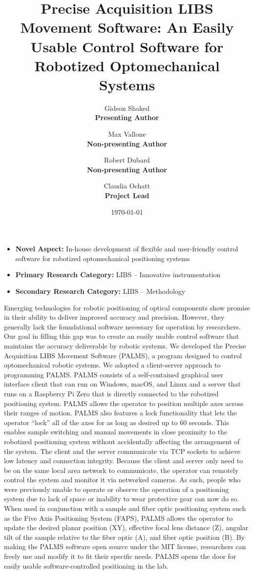 \documentclass[12pt]{article}
\title{Precise Acquisition LIBS Movement Software: An Easily Usable Control Software for Robotized Optomechanical Systems}
\author{
    Gideon Shaked\\
    \textbf{Presenting Author}
    \and
    Max Vallone\\
    \textbf{Non-presenting Author} 
    \and
    Robert Dubard\\
    \textbf{Non-presenting Author}
    \and
    Claudia Ochatt\\
    \textbf{Project Lead}
}
\date{\today}
\begin{document}
    \maketitle

    \begin{itemize}
        \item \textbf{Novel Aspect:} In-house development of flexible and user-friendly control software for robotized optomechanical positioning systems
        \item \textbf{Primary Research Category:} LIBS -- Innovative instrumentation
        \item \textbf{Secondary Research Category:} LIBS -- Methodology
    \end{itemize}

    Emerging technologies for robotic positioning of optical components show promise in their ability to deliver improved accuracy and precision. 
    However, 
    they generally lack the foundational software necessary for operation by researchers. 
    Our goal in filling this gap was to 
    create an easily usable control software that maintains the accuracy deliverable by robotic systems. 
    We developed the Precise Acquisition LIBS Movement Software (PALMS), 
    a program designed to control optomechanical robotic systems. 
    We adopted a client-server approach to programming PALMS\@. 
    PALMS consists of a self-contained graphical user interface client that can run on 
    Windows, 
    macOS, 
    and Linux 
    and a server that runs on a Raspberry Pi Zero 
    that is directly connected to the robotized positioning system. 
    PALMS allows the operator to position multiple axes across their ranges of motion. 
    PALMS also features a lock functionality that lets the operator \enquote{lock} all of the axes for as long as desired up to 60 seconds. 
    This enables sample switching 
    and manual movements 
    in close proximity to the robotized positioning system 
    without accidentally affecting the arrangement of the system. 
    The client and the server communicate via TCP sockets to achieve low latency and connection integrity. 
    Because the client and server only need to be on the same local area network to communicate, 
    the operator can remotely control the system and monitor it via networked cameras. 
    As such, people who were previously unable to operate or observe the operation of a positioning system 
    due to lack of space or inability to wear protective gear 
    can now do so. 
    When used in conjunction with a sample and fiber optic positioning system 
    such as the Five Axis Positioning System (FAPS), 
    PALMS allows the operator to update the desired planar position (XY), 
    effective focal lens distance (Z), 
    angular tilt of the sample relative to the fiber optic (A), 
    and fiber optic position (B). 
    By making the PALMS software open source under the MIT license, 
    researchers can freely use and modify it to fit their specific needs. 
    PALMS opens the door for easily usable software-controlled positioning in the lab.
\end{document}

